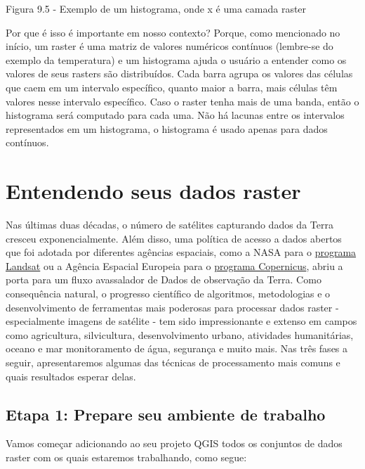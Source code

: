 \documentclass[
]{krantz}
\begin{document}
Figura 9.5 - Exemplo de um histograma, onde x é uma camada raster

Por que é isso é importante em nosso contexto? Porque, como mencionado no início, um raster é uma matriz de valores numéricos contínuos (lembre-se do exemplo da temperatura) e um histograma ajuda o usuário a entender como os valores de seus rasters são distribuídos. Cada barra agrupa os valores das células que caem em um intervalo específico, quanto maior a barra, mais células têm valores nesse intervalo específico. Caso o raster tenha mais de uma banda, então o histograma será computado para cada uma. Não há lacunas entre os intervalos representados em um histograma, o histograma é usado apenas para dados contínuos.

\hypertarget{entendendo-seus-dados-raster}{%
\section{Entendendo seus dados raster}\label{entendendo-seus-dados-raster}}

Nas últimas duas décadas, o número de satélites capturando dados da Terra cresceu exponencialmente. Além disso, uma política de acesso a dados abertos que foi adotada por diferentes agências espaciais, como a NASA para o \href{https://www.usgs.gov/core-science-systems/nli/landsat/landsat-data-access?qt-science_support_page_related_con=0\#qt-science_support_page_related_con}{programa Landsat} ou a Agência Espacial Europeia para o \href{https://www.copernicus.eu/en/access-data}{programa Copernicus}, abriu a porta para um fluxo avassalador de Dados de observação da Terra. Como consequência natural, o progresso científico de algoritmos, metodologias e o desenvolvimento de ferramentas mais poderosas para processar dados raster - especialmente imagens de satélite - tem sido impressionante e extenso em campos como agricultura, silvicultura, desenvolvimento urbano, atividades humanitárias, oceano e mar monitoramento de água, segurança e muito mais. Nas três fases a seguir, apresentaremos algumas das técnicas de processamento mais comuns e quais resultados esperar delas.

\hypertarget{etapa-1-prepare-seu-ambiente-de-trabalho-1}{%
\subsection{Etapa 1: Prepare seu ambiente de trabalho}\label{etapa-1-prepare-seu-ambiente-de-trabalho-1}}

Vamos começar adicionando ao seu projeto QGIS todos os conjuntos de dados raster com os quais estaremos trabalhando, como segue:
\end{document}
